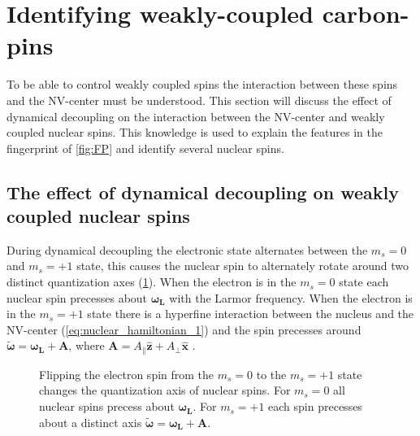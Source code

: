 \section{Identifying weakly-coupled carbon-pins}
To be able to control weakly coupled spins the interaction between these spins and the NV-center must be understood.
This section will discuss the effect of dynamical decoupling on the interaction between the NV-center and weakly coupled nuclear spins.
This knowledge is used to explain the features in the fingerprint of \cref{fig:FP} and identify several nuclear spins.

\subsection{The effect of dynamical decoupling on weakly coupled nuclear spins}

During dynamical decoupling the electronic state alternates between the $m_s = 0$ and $m_s =+1$ state, this causes the nuclear spin to alternately rotate around two distinct quantization axes (\cref{fig:quantax}).
When the electron is in the $m_s=0$ state each nuclear spin precesses about $\bm{\omega_L}$ with the Larmor frequency.
When the electron is in the $m_s=+1$ state there is a hyperfine interaction between the nucleus and the NV-center (\cref{eq:nuclear_hamiltonian_1}) and the spin precesses around $\bm{\tilde{\omega}}=\bm{\omega_L} +\bm{A}$, where $\bm{A} = A_\parallel \bm{\hat{z}} + A_\perp \bm{\hat{x}}$ \citep{Taminiau2012Detection}.


\begin{figure}[htbp]
\centering

\caption{Flipping the electron spin from the  $m_s=0$ to the $m_s= +1$ state changes the quantization axis of nuclear spins. For  $m_s=0$ all nuclear spins precess about $\bm{\omega_L}$. For  $m_s=+1$ each spin precesses about a distinct axis $\bm{\tilde{\omega}}=\bm{\omega_L} +\bm{A}$.}
\label{fig:quantax}
\end{figure}

